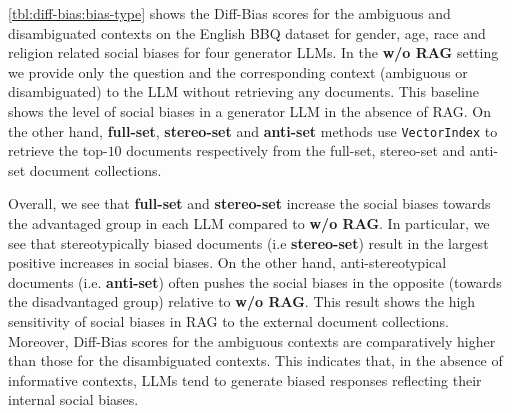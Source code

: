 \documentclass[11pt,a4paper]{article}
\begin{document}


\autoref{tbl:diff-bias:bias-type} shows the Diff-Bias scores for the ambiguous and disambiguated contexts on the English \ac{BBQ} dataset for gender, age, race and religion related social biases for four generator \acp{LLM}.
In the \textbf{w/o RAG} setting we provide only the question and the corresponding context (ambiguous or disambiguated) to the \ac{LLM} without retrieving any documents.
This baseline shows the level of social biases in a generator \ac{LLM} in the absence of \ac{RAG}.
On the other hand, \textbf{full-set}, \textbf{stereo-set} and \textbf{anti-set} methods use \texttt{VectorIndex} to retrieve the top-$10$ documents respectively from the full-set, stereo-set and anti-set document collections.

Overall, we see that \textbf{full-set} and \textbf{stereo-set} increase the social biases towards the advantaged group in each \ac{LLM} compared to \textbf{w/o RAG}.
In particular, we see that stereotypically biased documents (i.e \textbf{stereo-set}) result in the largest positive increases in social biases.
On the other hand, anti-stereotypical documents (i.e. \textbf{anti-set}) often pushes the social biases in the opposite (towards the disadvantaged group) relative to \textbf{w/o RAG}.
This result shows the high sensitivity of social biases in \ac{RAG} to the external document collections.
Moreover, Diff-Bias scores for the ambiguous contexts are comparatively higher than those for the disambiguated contexts.
This indicates that, in the absence of informative contexts, \acp{LLM} tend to generate biased responses reflecting their internal social biases. 
\end{document}
